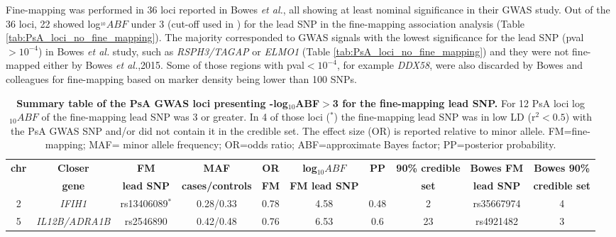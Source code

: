 Fine-mapping was performed in 36 loci reported in Bowes \textit{et al.}, all showing at least nominal significance in their GWAS study. Out of the 36 loci, 22 showed log$^{_10}ABF$ under 3 (cut-off used in \parencite{Bunt2015}) for the lead SNP in the fine-mapping association analysis (Table \ref{tab:PsA_loci_no_fine_mapping}). The majority corresponded to GWAS signals with the lowest significance for the lead SNP (pval$>10^{-4}$) in Bowes \textit{et al.} study, such as \textit{RSPH3/TAGAP} or \textit{ELMO1} (Table \ref{tab:PsA_loci_no_fine_mapping}) and they were not fine-mapped either by Bowes \textit{et al.},2015. Some of those regions with pval$<10^{-4}$, for example \textit{DDX58}, were also discarded by Bowes and colleagues for fine-mapping based on marker density being lower than 100 SNPs. 
 

\begin{landscape}
\begin{center}
\begin{longtable}[ht]{c c c c c c c c c c}
\caption[Summary table of the PsA GWAS loci presenting log${_10}ABF>3$ for the fine-mapping lead SNP.]{\textbf{Summary table of the PsA GWAS loci presenting -log${_10}$ABF$>$3 for the fine-mapping lead SNP.} For 12 PsA loci log${_10}ABF$ of the fine-mapping lead SNP was 3 or greater. In 4 of those loci ($^{\ast}$) the fine-mapping lead SNP was in low LD (r${^2}<0.5$) with the PsA GWAS SNP and/or did not contain it in the credible set. The effect size (OR) is reported relative to minor allele. FM=fine-mapping; MAF= minor allele frequency; OR=odds ratio; ABF=approximate Bayes factor; PP=posterior probability.}
\label{tab:PsA_fine_mapping_summary} \\
\toprule
\textbf{chr} & \textbf{Closer} & \textbf{FM} & \textbf{MAF} & \textbf{OR} & \textbf{log${_10}ABF$} & \textbf{PP} & \textbf{90\% credible} &\textbf{Bowes FM} & \textbf{Bowes 90\%}\\
    & \textbf{gene} & \textbf{lead SNP} & \textbf{cases/controls} & \textbf{FM} & \textbf{FM lead SNP} &  & \textbf{set} &\textbf{lead SNP} & \textbf{credible set} \\
\midrule
\midrule
2	 &\textit{IFIH1}	       & rs13406089$^{\ast}$	&0.28/0.33	&0.78	&4.58	&0.48	&2	&rs35667974	&4 \\
5	 &\textit{IL12B/ADRA1B}  & rs2546890	          &0.42/0.48	&0.76	&6.53	&0.6	&23	&rs4921482	&3 \\

\end{longtable}
\end{center}
\end{landscape}
